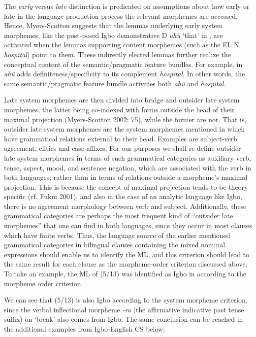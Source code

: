 \documentclass[output=paper]{langsci/langscibook}
\begin{document}
The \textit{early} versus \textit{late} distinction is predicated on assumptions about how early or late in the language production process the relevant morphemes are accessed. Hence, Myers-Scotton suggests that the lemmas underlying early system morphemes, like the post-posed Igbo demonstrative D \textit{ahü }‘that’ in , are activated when the lemmas supporting content morphemes (such as the EL N \textit{hospital}) point to them. These indirectly elected lemmas further realize the conceptual content of the semantic/pragmatic feature bundles. For example, in  \textit{ahü }adds definiteness/specificity to its complement \textit{hospital}. In other words, the same semantic/pragmatic feature bundle activates both \textit{ahü }and \textit{hospital. }

Late system morphemes are then divided into bridge and outsider late system morphemes, the latter being co-indexed with forms outside the head of their maximal projection (Myers-Scotton 2002: 75), while the former are not. That is, outsider late system morphemes are the system morphemes mentioned in  which have grammatical relations external to their head. Examples are subject-verb agreement, clitics and case affixes. For our purposes we shall re-define outsider late system morphemes in terms of such grammatical categories as auxiliary verb, tense, aspect, mood, and sentence negation, which are associated with the verb in both languages; rather than in terms of relations outside a morpheme’s maximal projection. This is because the concept of maximal projection tends to be theory-specific (cf. Fukui 2001), and also in the case of an analytic language like Igbo, there is no agreement morphology between verb and subject. Additionally, these grammatical categories are perhaps the most frequent kind of “outsider late morphemes” that one can find in both languages, since they occur in most clauses which have finite verbs. Thus, the language source of the earlier mentioned grammatical categories in bilingual clauses containing the mixed nominal expressions should enable us to identify the ML, and this criterion should lead to the same result for each clause as the morpheme-order criterion discussed above. To take an example, the ML of (5/13) was identified as Igbo in  according to the morpheme order criterion.

We can see that (5/13) is also Igbo according to the system morpheme criterion, since the verbal inflectional morpheme \textit{{}-ra} (the affirmative indicative past tense suffix) on ‘break’ also comes from Igbo. The same conclusion can be reached in the additional examples from Igbo-English CS below: 
\end{document}
